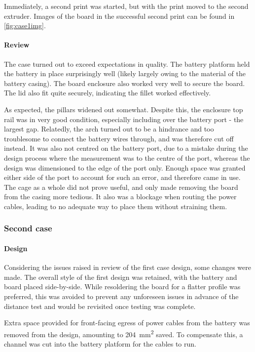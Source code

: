 Immediately, a second print was started, but with the print moved to the second extruder.
Images of the board in the successful second print can be found in \cref{fig:case1img}.

\paragraph{Review}
The case turned out to exceed expectations in quality. The battery platform held the battery
in place surprisingly well (likely largely owing to the material of the battery casing).
The board enclosure also worked very well to secure the board. The lid also fit quite securely,
indicating the fillet worked effectively.

As expected, the pillars widened out somewhat. Despite this, the enclosure
top rail was in very good condition, especially including over the battery port - the largest
gap. Relatedly, the arch turned out to be a hindrance
and too troublesome to connect the battery wires through, and was therefore cut off instead. It
was also not centred on the battery port, due to a mistake during the design process where the
measurement was to the centre of the port, whereas the design was dimensioned to the edge of the
port only. Enough space was granted either side of the port to account for such an error,
and therefore came in use.
The cage as a whole did not prove useful, and only made removing the board from the casing more
tedious. It also was a blockage when routing the power cables, leading to no adequate way to
place them without straining them.

\subsubsection{Second case}
\paragraph{Design}
Considering the issues raised in review of the first case design, some changes were made.
The overall style of the first design was retained, with the battery and board placed
side-by-side. While resoldering the board for a flatter profile was preferred, this
was avoided to prevent any unforeseen issues in advance of the distance test and
would be revisited once testing was complete.

Extra space provided for front-facing egress of power
cables from the battery was removed from the design, amounting to \qty{204}{\mm\squared} saved.
To compensate this, a channel was cut into the battery platform for the cables to run.

